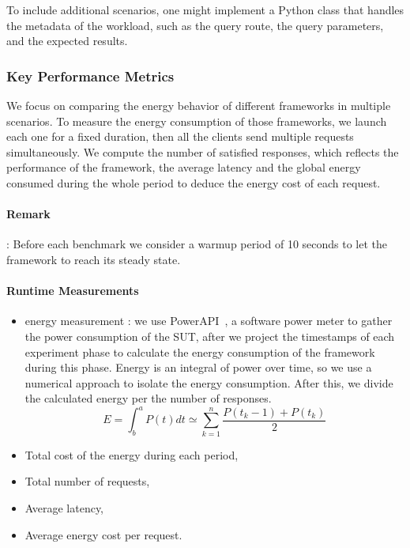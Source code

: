 To include additional scenarios, one might implement a Python class that handles the metadata of the workload, such as the query route, the query parameters, and the expected results.
\subsubsection{Key Performance Metrics}
We focus on comparing the energy behavior of different frameworks in multiple scenarios.
To measure the energy consumption of those frameworks, we launch each one for a fixed duration, then all the clients send multiple requests simultaneously.
We compute the number of satisfied responses, which reflects the performance of the framework, the average latency and the global energy consumed during the whole period to deduce the energy cost of each request.

\paragraph{Remark}:
Before each benchmark we consider a warmup period of 10 seconds to let the framework to reach its steady state.

\paragraph{Runtime Measurements}
\begin{itemize}
    \item energy measurement :
          we use PowerAPI~\cite{bourdon:hal-00772454}, a software power meter to gather the power consumption of the SUT, after we project the timestamps of each experiment phase to calculate the energy consumption of the framework during this phase.
          Energy is an integral of power over time, so we use a numerical approach to isolate the energy consumption.%
          After this, we divide the calculated energy per the number of responses.
          \begin{equation}
              E = \int^a_b P(t)dt \simeq \sum^n_{k=1} \frac{P(t_k-1)+P(t_k)}{2}
          \end{equation}
    \item Total cost of the energy during each period,
    \item Total number of requests,
    \item Average latency,
    \item Average energy cost per request.
\end{itemize}

